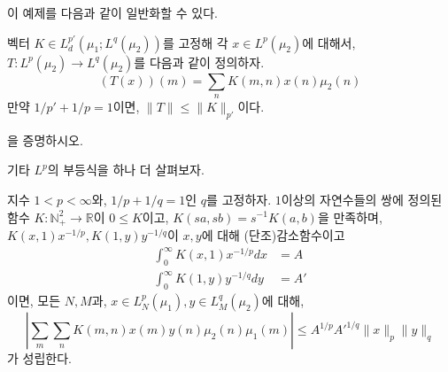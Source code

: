 이 예제를 다음과 같이 일반화할 수 있다.
\begin{theorem}
\label{thm:kernelop1}
    벡터 $K \in L^{p'}_d(\mu_1; L^q(\mu_2))$를 고정해 각 $x \in L^p(\mu_2)$에 대해서, $T: L^p(\mu_2) \to L^q(\mu_2)$를 다음과 같이 정의하자.
    \begin{equation*}
        (T(x))(m) = \sum_n K(m, n) x(n) \mu_2(n)
    \end{equation*}
    만약 $1/p' + 1/p = 1$이면, $\|T\| \leq \|K\|_{p'}$이다.
\end{theorem}
\begin{exercise}
    을 증명하시오.
\end{exercise}

기타 $L^p$의 부등식을 하나 더 살펴보자.

\begin{theorem}
\label{thm:hdypolyaineq}
    지수 $1 < p < \infty$와, $1/p + 1/q = 1$인 $q$를 고정하자.
    $1$이상의 자연수들의 쌍에 정의된 함수 $K : \mathbb{N}_{+}^2 \to \mathbb{R}$이 $0 \leq K$이고, $K(sa, sb) = s^{-1}K(a, b)$을 만족하며, $K(x, 1)x^{-1/p}, K(1, y)y^{-1/q}$이 $x, y$에 대해 (단조)감소함수이고
    \begin{align*}
        \int_0^\infty K(x, 1) x^{-1/p} dx &= A \\
        \int_0^\infty K(1, y) y^{-1/q} dy &= A'
    \end{align*}
    이면, 모든 $N, M$과, $x \in L^p_N(\mu_1), y \in L^q_M(\mu_2)$에 대해,
    \begin{equation*}
        \left| \sum_m \sum_n K(m,n)x(m)y(n) \mu_2(n) \mu_1(m) \right| \leq A^{1/p} A'^{1/q} \|x\|_p \|y\|_q
    \end{equation*}
    가 성립한다.
    
\end{theorem}

